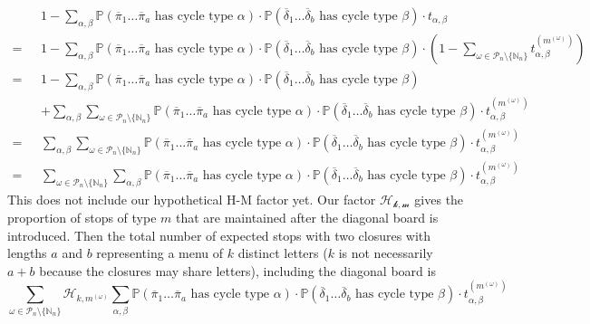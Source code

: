 \begin{align*}
&1-\sum_{\alpha, \beta}\mathbb{P}(\overline\pi_1\dots\overline\pi_a\text{ has cycle type }\alpha)\cdot\mathbb{P}(\overline\delta_1\dots\overline\delta_b\text{ has cycle type }\beta)\cdot t_{\alpha, \beta}\\
= \text{ }&1-\sum_{\alpha, \beta}\mathbb{P}(\overline\pi_1\dots\overline\pi_a\text{ has cycle type }\alpha)\cdot\mathbb{P}(\overline\delta_1\dots\overline\delta_b\text{ has cycle type }\beta)\cdot (1 - \sum_{\omega\in\mathcal{P}_n\setminus\{\mathbb{N}_n\}}t_{\alpha,\beta}^{(m^{(\omega)})})\\
= \text{ }&1-\sum_{\alpha, \beta}\mathbb{P}(\overline\pi_1\dots\overline\pi_a\text{ has cycle type }\alpha)\cdot\mathbb{P}(\overline\delta_1\dots\overline\delta_b\text{ has cycle type }\beta) 
\\\text{ }&+ \sum_{\alpha,\beta}\sum_{\omega\in\mathcal{P}_n\setminus\{\mathbb{N}_n\}}\mathbb{P}(\overline\pi_1\dots\overline\pi_a\text{ has cycle type }\alpha)\cdot\mathbb{P}(\overline\delta_1\dots\overline\delta_b\text{ has cycle type }\beta)\cdot t_{\alpha,\beta}^{(m^{(\omega)})}\\
=\text{ }&\sum_{\alpha,\beta}\sum_{\omega\in\mathcal{P}_n\setminus\{\mathbb{N}_n\}}\mathbb{P}(\overline\pi_1\dots\overline\pi_a\text{ has cycle type }\alpha)\cdot\mathbb{P}(\overline\delta_1\dots\overline\delta_b\text{ has cycle type }\beta)\cdot t_{\alpha,\beta}^{(m^{(\omega)})}\\
=\text{ }&\sum_{\omega\in\mathcal{P}_n\setminus\{\mathbb{N}_n\}}\sum_{\alpha,\beta}\mathbb{P}(\overline\pi_1\dots\overline\pi_a\text{ has cycle type }\alpha)\cdot\mathbb{P}(\overline\delta_1\dots\overline\delta_b\text{ has cycle type }\beta)\cdot t_{\alpha,\beta}^{(m^{(\omega)})}
\end{align*}
This does not include our hypothetical H-M factor yet. Our factor $\mathcal{H_{k,m}}$ gives the proportion of stops of type $m$ that are maintained after the diagonal board is introduced. Then the total number of expected stops with two closures with lengths $a$ and $b$ representing a menu of $k$ distinct letters ($k$ is not necessarily $a+b$ because the closures may share letters), including the diagonal board is 
\[
\sum_{\omega\in\mathcal{P}_n\setminus\{\mathbb{N}_n\}}\mathcal{H}_{k,m^{(\omega)}}\sum_{\alpha,\beta}\mathbb{P}(\overline\pi_1\dots\overline\pi_a\text{ has cycle type }\alpha)\cdot\mathbb{P}(\overline\delta_1\dots\overline\delta_b\text{ has cycle type }\beta)\cdot t_{\alpha,\beta}^{(m^{(\omega)})}
\]
